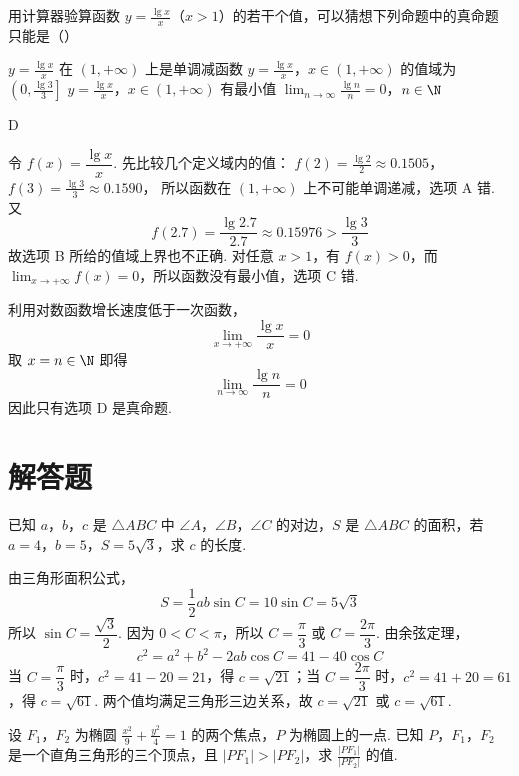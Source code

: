 \begin{problem}
用计算器验算函数 \(y=\frac{\lg x}{x}\)（\(x>1\)）的若干个值，可以猜想下列命题中的真命题只能是（\quad）

\choices
    {\(y=\frac{\lg x}{x}\) 在 \((1,+\infty)\) 上是单调减函数}
    {\(y=\frac{\lg x}{x}\)，\(x\in(1,+\infty)\) 的值域为 \(\left(0,\frac{\lg 3}{3}\right]\)}
    {\(y=\frac{\lg x}{x}\)，\(x\in(1,+\infty)\) 有最小值}
    {\(\displaystyle\lim_{n\to\infty}\frac{\lg n}{n}=0\)，\(n\in\N\)}
\end{problem}

\begin{answer}
D
\end{answer}

\begin{solution}
令 \(f(x)=\dfrac{\lg x}{x}\). 先比较几个定义域内的值：
\(f(2)=\frac{\lg2}{2}\approx0.1505\)，\(f(3)=\frac{\lg3}{3}\approx0.1590\)，
所以函数在 \((1,+\infty)\) 上不可能单调递减，选项 A 错. 又
\[
f(2.7)=\frac{\lg2.7}{2.7}\approx0.15976>\frac{\lg3}{3}
\]
故选项 B 所给的值域上界也不正确. 对任意 \(x>1\)，有 \(f(x)>0\)，而 \(\displaystyle\lim_{x\to+\infty}f(x)=0\)，所以函数没有最小值，选项 C 错.

利用对数函数增长速度低于一次函数，
\[
\lim_{x\to+\infty}\frac{\lg x}{x}=0
\]
取 \(x=n\in\N\) 即得
\[
\lim_{n\to\infty}\frac{\lg n}{n}=0
\]
因此只有选项 D 是真命题.
\end{solution}

\section{解答题}
\begin{problem}
已知 \(a\)，\(b\)，\(c\) 是 \(\triangle ABC\) 中 \(\angle A\)，\(\angle B\)，\(\angle C\) 的对边，\(S\) 是 \(\triangle ABC\) 的面积，若 \(a=4\)，\(b=5\)，\(S=5\sqrt{3}\)，求 \(c\) 的长度.
\end{problem}

\begin{solution}
由三角形面积公式，
\[
S=\frac{1}{2}ab\sin C=10\sin C=5\sqrt{3}
\]
所以 \(\sin C=\dfrac{\sqrt{3}}{2}\). 因为 \(0<C<\pi\)，所以 \(C=\dfrac{\pi}{3}\) 或 \(C=\dfrac{2\pi}{3}\). 由余弦定理，
\[
c^2=a^2+b^2-2ab\cos C=41-40\cos C
\]
当 \(C=\dfrac{\pi}{3}\) 时，\(c^2=41-20=21\)，得 \(c=\sqrt{21}\)；当 \(C=\dfrac{2\pi}{3}\) 时，\(c^2=41+20=61\)，得 \(c=\sqrt{61}\). 两个值均满足三角形三边关系，故 \(c=\sqrt{21}\) 或 \(c=\sqrt{61}\).
\end{solution}

\begin{problem}
设 \(F_1\)，\(F_2\) 为椭圆 \(\frac{x^2}{9}+\frac{y^2}{4}=1\) 的两个焦点，\(P\) 为椭圆上的一点. 已知 \(P\)，\(F_1\)，\(F_2\) 是一个直角三角形的三个顶点，且 \(|PF_1|>|PF_2|\)，求 \(\frac{|PF_1|}{|PF_2|}\) 的值.
\end{problem}

